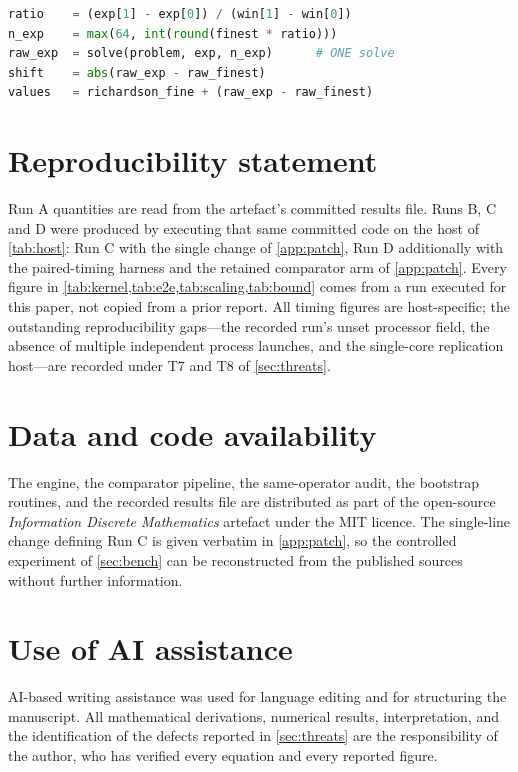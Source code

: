 \documentclass[twocolumn,10pt,a4paper]{article}
\theoremstyle{plain}
\theoremstyle{definition}
\begin{document}
\begin{lstlisting}[language=Python]
ratio    = (exp[1] - exp[0]) / (win[1] - win[0])
n_exp    = max(64, int(round(finest * ratio)))
raw_exp  = solve(problem, exp, n_exp)      # ONE solve
shift    = abs(raw_exp - raw_finest)
values   = richardson_fine + (raw_exp - raw_finest)
\end{lstlisting}

\section*{Reproducibility statement}
Run A quantities are read from the artefact's committed results file. Runs B,
C and D were produced by executing that same committed code on the host of
\cref{tab:host}: Run C with the single change of \cref{app:patch}, Run D
additionally with the paired-timing harness and the retained comparator arm of
\cref{app:patch}. Every figure in \cref{tab:kernel,tab:e2e,tab:scaling,tab:bound}
comes from a run executed for this paper, not copied from a prior report. All timing
figures are host-specific; the outstanding reproducibility gaps---the recorded
run's unset processor field, the absence of multiple independent process
launches, and the single-core replication host---are recorded under T7 and T8 of
\cref{sec:threats}.

\section*{Data and code availability}
\begin{sloppypar}
The engine, the comparator pipeline, the same-operator
audit, the bootstrap routines, and the recorded
results file are distributed as part of the open-source
\emph{Information Discrete Mathematics} artefact under
the MIT licence. The single-line change defining Run C is given verbatim in
\cref{app:patch}, so the controlled experiment of \cref{sec:bench} can be
reconstructed from the published sources without further information.
\end{sloppypar}

\section*{Use of AI assistance}
AI-based writing assistance was used for language editing and for structuring
the manuscript. All mathematical derivations, numerical results, interpretation,
and the identification of the defects reported in \cref{sec:threats} are the
responsibility of the author, who has verified every equation and every reported
figure.
\end{document}
